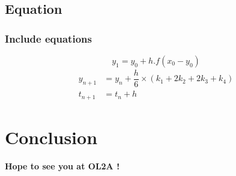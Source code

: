 \documentclass[aspectratio=169]{beamer}
\begin{document}
\subsection{Equation}
\begin{frame}
\frametitle{Include equations}
\begin{equation}
    y_1=y_0 + h.f(x_0-y_0)
\end{equation}
\begin{subequations}
\begin{align}
    y_{n+1}& = y_{n}+\dfrac{h}{6} \times (k_1 +2k_2 + 2k_3 + k_4)\\
    t_{n+1}& = t_n + h
\end{align}
\end{subequations}
\end{frame}

\section{Conclusion}
\begin{frame}
    \begin{center}
        \vfill
        {\Large \bf Hope to see you at OL2A !}\\
        \vfill
    \end{center}
\end{frame}


\end{document}
